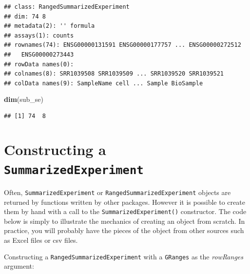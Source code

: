 \documentclass[]{article}
\newenvironment{Shaded}{\begin{snugshade}}{\end{snugshade}}
\newcommand{\KeywordTok}[1]{\textcolor[rgb]{0.13,0.29,0.53}{\textbf{#1}}}
\newcommand{\NormalTok}[1]{#1}
\begin{document}
\begin{verbatim}
## class: RangedSummarizedExperiment 
## dim: 74 8 
## metadata(2): '' formula
## assays(1): counts
## rownames(74): ENSG00000131591 ENSG00000177757 ... ENSG00000272512
##   ENSG00000273443
## rowData names(0):
## colnames(8): SRR1039508 SRR1039509 ... SRR1039520 SRR1039521
## colData names(9): SampleName cell ... Sample BioSample
\end{verbatim}

\begin{Shaded}
\begin{Highlighting}[]
\KeywordTok{dim}\NormalTok{(sub_se)}
\end{Highlighting}
\end{Shaded}

\begin{verbatim}
## [1] 74  8
\end{verbatim}

\hypertarget{constructing-a-summarizedexperiment}{%
\section{\texorpdfstring{Constructing a
\texttt{SummarizedExperiment}}{Constructing a SummarizedExperiment}}\label{constructing-a-summarizedexperiment}}

Often, \texttt{SummarizedExperiment} or
\texttt{RangedSummarizedExperiment} objects are returned by functions
written by other packages. However it is possible to create them by hand
with a call to the \texttt{SummarizedExperiment()} constructor. The code
below is simply to illustrate the mechanics of creating an object from
scratch. In practice, you will probably have the pieces of the object
from other sources such as Excel files or csv files.

Constructing a \texttt{RangedSummarizedExperiment} with a
\texttt{GRanges} as the \emph{rowRanges} argument:
\end{document}

